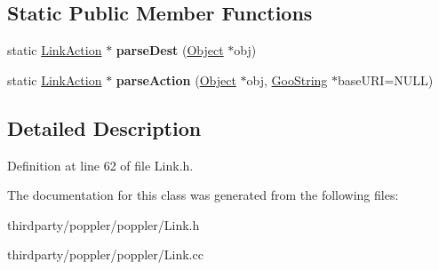 \subsection*{Static Public Member Functions}
\begin{DoxyCompactItemize}
\item 
\mbox{\label{class_link_action_ac6ce91e675f862f8e4ff3d51d20f3bae}} 
static \hyperlink{class_link_action}{Link\+Action} $\ast$ {\bfseries parse\+Dest} (\hyperlink{class_object}{Object} $\ast$obj)
\item 
\mbox{\label{class_link_action_acd26887e095cfba7c31c7d79609cd2d8}} 
static \hyperlink{class_link_action}{Link\+Action} $\ast$ {\bfseries parse\+Action} (\hyperlink{class_object}{Object} $\ast$obj, \hyperlink{class_goo_string}{Goo\+String} $\ast$base\+U\+RI=N\+U\+LL)
\end{DoxyCompactItemize}


\subsection{Detailed Description}


Definition at line 62 of file Link.\+h.



The documentation for this class was generated from the following files\+:\begin{DoxyCompactItemize}
\item 
thirdparty/poppler/poppler/Link.\+h\item 
thirdparty/poppler/poppler/Link.\+cc\end{DoxyCompactItemize}
